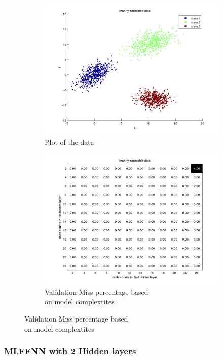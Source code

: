 \documentclass[fleqn]{article}
\begin{document}
\begin{figure}[!ht]
\begin{subfigure}{.5\textwidth}
  \caption{Plot of the data}
\includegraphics[scale=0.4]{pics/linearlyseparable/dataPlot}
\end{subfigure}
\begin{subfigure}{.5\textwidth}
  \caption{Validation Miss percentage based\\ on model complextites \label{fig:missp}}
\includegraphics[scale=0.2]{pics/linearlyseparable/linearly separable data_validationerror}
\end{subfigure}
\end{figure}


\subsubsection{MLFFNN with 2 Hidden layers}
\end{document}
